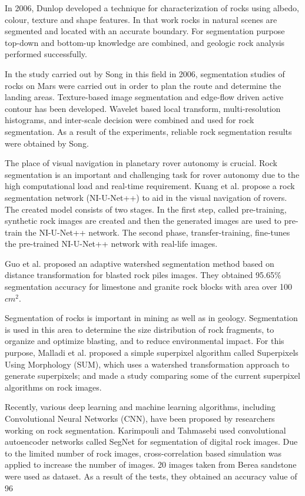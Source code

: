 \documentclass[a4paper,fleqn]{cas-sc}
\begin{document}
In 2006, Dunlop \citep{dunlop2006automatic} developed a technique for characterization of rocks using albedo, colour, texture and shape features. In that work rocks in natural scenes are segmented and located with an accurate boundary. For segmentation purpose top-down and bottom-up knowledge are combined, and geologic rock analysis performed successfully.

In the study carried out by Song \citep{Song2006AFF} in this field in 2006, segmentation studies of rocks on Mars were carried out in order to plan the route and determine the landing areas. Texture-based image segmentation and edge-flow driven active contour has been developed. Wavelet based local transform, multi-resolution histograms, and inter-scale decision were combined and used for rock segmentation. As a result of the experiments, reliable rock segmentation results were obtained by Song.

The place of visual navigation in planetary rover autonomy is crucial. Rock segmentation is an important and challenging task for rover autonomy due to the high computational load and real-time requirement. Kuang et al. \citep{kuang2021rock} propose a rock segmentation network (NI-U-Net++) to aid in the visual navigation of rovers. The created model consists of two stages. In the first step, called pre-training, synthetic rock images are created and then the generated images are used to pre-train the NI-U-Net++ network. The second phase, transfer-training, fine-tunes the pre-trained NI-U-Net++ network with real-life images.

Guo et al. \citep{guo2022method} proposed an adaptive watershed segmentation method based on distance transformation for blasted rock piles images. They obtained 95.65\% segmentation accuracy for limestone and granite rock blocks with area over 100 $cm^2$. 

Segmentation of rocks is important in mining as well as in geology. Segmentation is used in this area to determine the size distribution of rock fragments, to organize and optimize blasting, and to reduce environmental impact. For this purpose, Malladi et al. \citep{malladi2014superpixels} proposed a simple superpixel algorithm called Superpixels Using Morphology (SUM), which uses a watershed transformation approach to generate superpixels; and made a study comparing some of the current superpixel algorithms on rock images.

Recently, various deep learning and machine learning algorithms, including Convolutional Neural Networks (CNN), have been proposed by researchers working on rock segmentation. Karimpouli and Tahmasebi \citep{karimpouli2019segmentation} used convolutional autoencoder networks called SegNet for segmentation of digital rock images. Due to the limited number of rock images, cross-correlation based simulation was applied to increase the number of images. 20 images taken from Berea sandstone were used as dataset. As a result of the tests, they obtained an accuracy value of 96%
\end{document}
